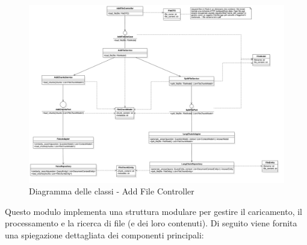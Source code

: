     \begin{figure}[H]
        \centering
        \includegraphics[width=\linewidth, height=0.8\textheight, keepaspectratio]{./img/AddFileController.png}
        \caption{Diagramma delle classi - Add File Controller}
        \label{fig:add_file_controller}
    \end{figure}

    Questo modulo implementa una struttura modulare per gestire il caricamento, il processamento e la ricerca di file (e dei loro contenuti). Di seguito viene fornita una spiegazione dettagliata dei componenti principali:

